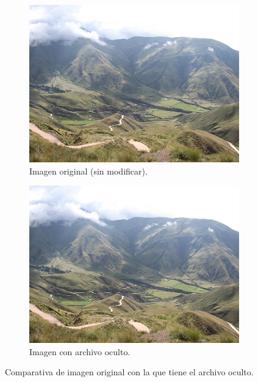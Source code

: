 \documentclass{article}
\begin{document}
\begin{figure}[H]
    \centering
    \begin{subfigure}[H]{0.49\textwidth}
        \centering
        \includegraphics[width=\textwidth]{imagenes/imagen.jpg}
        \caption{Imagen original (sin modificar).}
    \end{subfigure}
    \hfill
    \begin{subfigure}[H]{0.49\textwidth}
        \centering
        \includegraphics[width=\textwidth]{imagenes/imagenMod.jpg}
        \caption{Imagen con archivo oculto.}
    \end{subfigure}    
    \caption{Comparativa de imagen original con la que tiene el archivo oculto.}
\end{figure}
\end{document}
